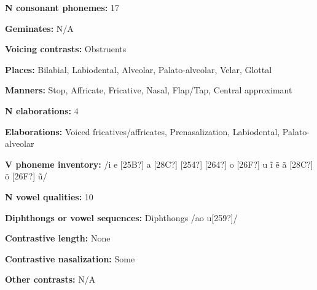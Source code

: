 \begin{styleBody}
\textbf{N consonant phonemes:} 17
\end{styleBody}

\begin{styleBody}
\textbf{Geminates:} N/A
\end{styleBody}

\begin{styleBody}
\textbf{Voicing contrasts:} Obstruents
\end{styleBody}

\begin{styleBody}
\textbf{Places:} Bilabial, Labiodental, Alveolar, Palato-alveolar, Velar, Glottal
\end{styleBody}

\begin{styleBody}
\textbf{Manners:} Stop, Affricate, Fricative, Nasal, Flap/Tap, Central approximant
\end{styleBody}

\begin{styleBody}
\textbf{N elaborations:} 4
\end{styleBody}

\begin{styleBody}
\textbf{Elaborations:} Voiced fricatives/affricates, Prenasalization, Labiodental, Palato-alveolar
\end{styleBody}

\begin{styleBody}
\textbf{V phoneme inventory:} /i e [25B?] a [28C?] [254?] [264?] o [26F?] u \~{i} \~{e} \~{a} [28C?] \~{o} [26F?] \~{u}/
\end{styleBody}

\begin{styleBody}
\textbf{N vowel qualities:} 10
\end{styleBody}

\begin{styleBody}
\textbf{Diphthongs or vowel sequences:} Diphthongs /ao u[259?]/
\end{styleBody}

\begin{styleBody}
\textbf{Contrastive length:} None
\end{styleBody}

\begin{styleBody}
\textbf{Contrastive nasalization:} Some
\end{styleBody}

\begin{styleBody}
\textbf{Other contrasts:} N/A
\end{styleBody}

